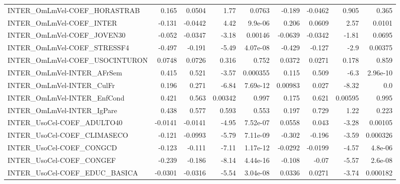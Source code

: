 \begin{tabular}{lrrrrrrrr}
INTER\_OmLmVel-COEF\_HORASTRAB          &       0.165 &       0.0504 &    1.77 &   0.0763 &     -0.189 &     -0.0462 &        0.905 &         0.365 \\
INTER\_OmLmVel-COEF\_INTER              &      -0.131 &      -0.0442 &    4.42 &  9.9e-06 &      0.206 &      0.0609 &         2.57 &        0.0101 \\
INTER\_OmLmVel-COEF\_JOVEN30            &      -0.052 &      -0.0347 &   -3.18 &  0.00146 &    -0.0639 &     -0.0342 &        -1.81 &        0.0695 \\
INTER\_OmLmVel-COEF\_STRESSF4           &      -0.497 &       -0.191 &   -5.49 & 4.07e-08 &     -0.429 &      -0.127 &         -2.9 &       0.00375 \\
INTER\_OmLmVel-COEF\_USOCINTURON        &      0.0748 &       0.0726 &   0.316 &    0.752 &     0.0372 &      0.0271 &        0.178 &         0.859 \\
INTER\_OmLmVel-INTER\_AFrSem            &       0.415 &        0.521 &   -3.57 & 0.000355 &      0.115 &       0.509 &         -6.3 &      2.96e-10 \\
INTER\_OmLmVel-INTER\_CulFr             &       0.196 &        0.271 &   -6.84 & 7.69e-12 &    0.00983 &       0.027 &        -8.32 &           0.0 \\
INTER\_OmLmVel-INTER\_EnfCond           &       0.421 &        0.563 & 0.00342 &    0.997 &      0.175 &       0.621 &      0.00595 &         0.995 \\
INTER\_OmLmVel-INTER\_IgPare            &       0.438 &        0.577 &   0.593 &    0.553 &      0.197 &       0.729 &         1.22 &         0.223 \\
INTER\_UsoCel-COEF\_ADULTO40            &     -0.0141 &      -0.0141 &   -4.95 & 7.52e-07 &     0.0558 &       0.043 &        -3.28 &       0.00105 \\
INTER\_UsoCel-COEF\_CLIMASECO           &      -0.121 &      -0.0993 &   -5.79 & 7.11e-09 &     -0.302 &      -0.196 &        -3.59 &      0.000326 \\
INTER\_UsoCel-COEF\_CONGCD              &      -0.123 &       -0.111 &   -7.11 & 1.17e-12 &    -0.0292 &     -0.0199 &        -4.57 &       4.8e-06 \\
INTER\_UsoCel-COEF\_CONGEF              &      -0.239 &       -0.186 &   -8.14 & 4.44e-16 &     -0.108 &       -0.07 &        -5.57 &       2.6e-08 \\
INTER\_UsoCel-COEF\_EDUC\_BASICA         &     -0.0301 &      -0.0316 &   -5.54 & 3.04e-08 &     0.0336 &      0.0271 &        -3.74 &      0.000182 \\

\end{tabular}

